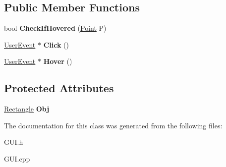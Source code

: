 \subsection*{Public Member Functions}
\begin{DoxyCompactItemize}
\item 
\mbox{\label{classWidget_add4af843fbd014c334c40216cd440913}} 
bool {\bfseries Check\+If\+Hovered} (\hyperlink{structPoint}{Point} P)
\item 
\mbox{\label{classWidget_a617f4ee017d17bcae89a33ffb5affde6}} 
\hyperlink{classUserEvent}{User\+Event} $\ast$ {\bfseries Click} ()
\item 
\mbox{\label{classWidget_ad583f576b84f40227987b38c1b5da5bd}} 
\hyperlink{classUserEvent}{User\+Event} $\ast$ {\bfseries Hover} ()
\end{DoxyCompactItemize}
\subsection*{Protected Attributes}
\begin{DoxyCompactItemize}
\item 
\mbox{\label{classWidget_a877ee32cf2532d36696a74e4b2e8a08d}} 
\hyperlink{structRectangle}{Rectangle} {\bfseries Obj}
\end{DoxyCompactItemize}


The documentation for this class was generated from the following files\+:\begin{DoxyCompactItemize}
\item 
G\+U\+I.\+h\item 
G\+U\+I.\+cpp\end{DoxyCompactItemize}
